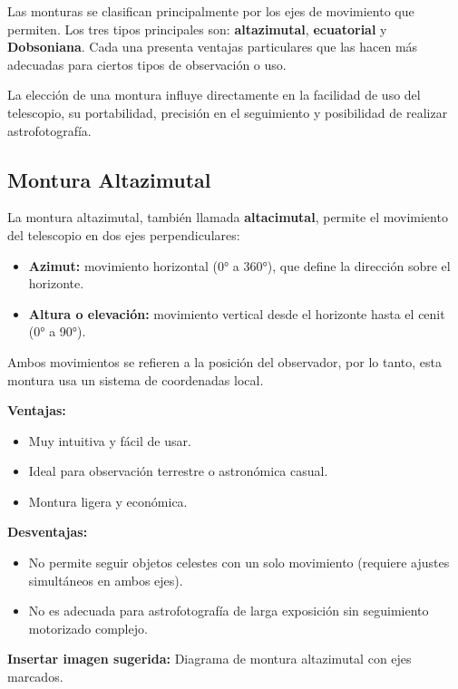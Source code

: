 Las monturas se clasifican principalmente por los ejes de movimiento que permiten. Los tres tipos principales son: \textbf{altazimutal}, \textbf{ecuatorial} y \textbf{Dobsoniana}. Cada una presenta ventajas particulares que las hacen más adecuadas para ciertos tipos de observación o uso.

La elección de una montura influye directamente en la facilidad de uso del telescopio, su portabilidad, precisión en el seguimiento y posibilidad de realizar astrofotografía.

\subsection{Montura Altazimutal}
\label{sec:montura_altazimutal}

La montura altazimutal, también llamada \textbf{altacimutal}, permite el movimiento del telescopio en dos ejes perpendiculares:

\begin{itemize}
	\item \textbf{Azimut:} movimiento horizontal (0° a 360°), que define la dirección sobre el horizonte.
	\item \textbf{Altura o elevación:} movimiento vertical desde el horizonte hasta el cenit (0° a 90°).
\end{itemize}

Ambos movimientos se refieren a la posición del observador, por lo tanto, esta montura usa un sistema de coordenadas local.

\textbf{Ventajas:}
\begin{itemize}
	\item Muy intuitiva y fácil de usar.
	\item Ideal para observación terrestre o astronómica casual.
	\item Montura ligera y económica.
\end{itemize}

\textbf{Desventajas:}
\begin{itemize}
	\item No permite seguir objetos celestes con un solo movimiento (requiere ajustes simultáneos en ambos ejes).
	\item No es adecuada para astrofotografía de larga exposición sin seguimiento motorizado complejo.
\end{itemize}

\vspace{0.3cm}
\textbf{Insertar imagen sugerida:} Diagrama de montura altazimutal con ejes marcados.

